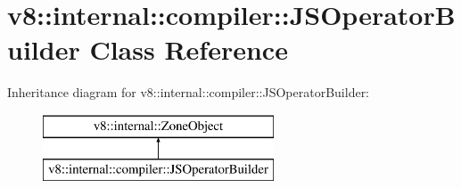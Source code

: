 \hypertarget{classv8_1_1internal_1_1compiler_1_1_j_s_operator_builder}{}\section{v8\+:\+:internal\+:\+:compiler\+:\+:J\+S\+Operator\+Builder Class Reference}
\label{classv8_1_1internal_1_1compiler_1_1_j_s_operator_builder}
Inheritance diagram for v8\+:\+:internal\+:\+:compiler\+:\+:J\+S\+Operator\+Builder\+:\begin{figure}[H]
\begin{center}
\leavevmode
\includegraphics[height=2.000000cm]{classv8_1_1internal_1_1compiler_1_1_j_s_operator_builder}
\end{center}
\end{figure}
